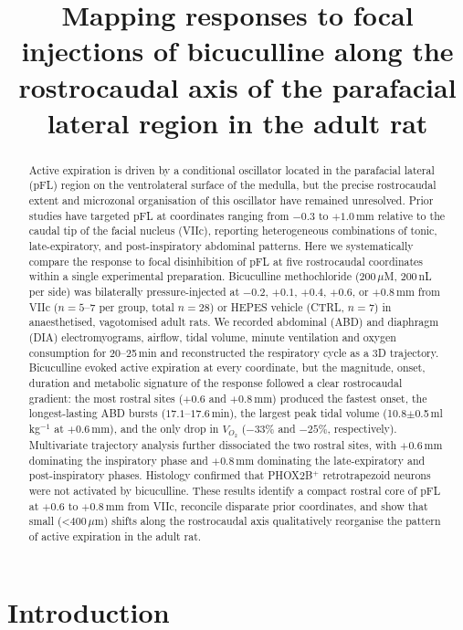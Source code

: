\documentclass[11pt]{article}
\title{Mapping responses to focal injections of bicuculline along the
rostrocaudal axis of the parafacial lateral region in the adult rat}
\author{}
\date{}
\begin{document}
\maketitle

\begin{abstract}
Active expiration is driven by a conditional oscillator located in the
parafacial lateral (pFL) region on the ventrolateral surface of the medulla,
but the precise rostrocaudal extent and microzonal organisation of this
oscillator have remained unresolved. Prior studies have targeted pFL at
coordinates ranging from $-0.3$ to $+1.0$\,mm relative to the caudal tip
of the facial nucleus (VIIc), reporting heterogeneous combinations of
tonic, late-expiratory, and post-inspiratory abdominal patterns. Here we
systematically compare the response to focal disinhibition of pFL at five
rostrocaudal coordinates within a single experimental preparation.
Bicuculline methochloride (200\,$\mu$M, 200\,nL per side) was bilaterally
pressure-injected at $-0.2$, $+0.1$, $+0.4$, $+0.6$, or $+0.8$\,mm from
VIIc ($n=5$--$7$ per group, total $n=28$) or HEPES vehicle (CTRL, $n=7$)
in anaesthetised, vagotomised adult rats. We recorded abdominal (ABD)
and diaphragm (DIA) electromyograms, airflow, tidal volume,
minute ventilation and oxygen consumption for 20--25\,min and reconstructed
the respiratory cycle as a 3D trajectory. Bicuculline evoked active
expiration at every coordinate, but the magnitude, onset, duration and
metabolic signature of the response followed a clear rostrocaudal
gradient: the most rostral sites ($+0.6$ and $+0.8$\,mm) produced the
fastest onset, the longest-lasting ABD bursts ($17.1$--$17.6$\,min),
the largest peak tidal volume (10.8$\pm$0.5\,ml\,kg$^{-1}$ at $+0.6$\,mm),
and the only drop in $V_{O_2}$ ($-33\%$ and $-25\%$, respectively).
Multivariate trajectory analysis further dissociated the two rostral
sites, with $+0.6$\,mm dominating the inspiratory phase and $+0.8$\,mm
dominating the late-expiratory and post-inspiratory phases. Histology
confirmed that PHOX2B$^+$ retrotrapezoid neurons were not activated by
bicuculline. These results identify a compact rostral core of pFL at
$+0.6$ to $+0.8$\,mm from VIIc, reconcile disparate prior coordinates,
and show that small (\textless$400$\,$\mu$m) shifts along the
rostrocaudal axis qualitatively reorganise the pattern of active
expiration in the adult rat.
\end{abstract}

\section{Introduction}
\end{document}

